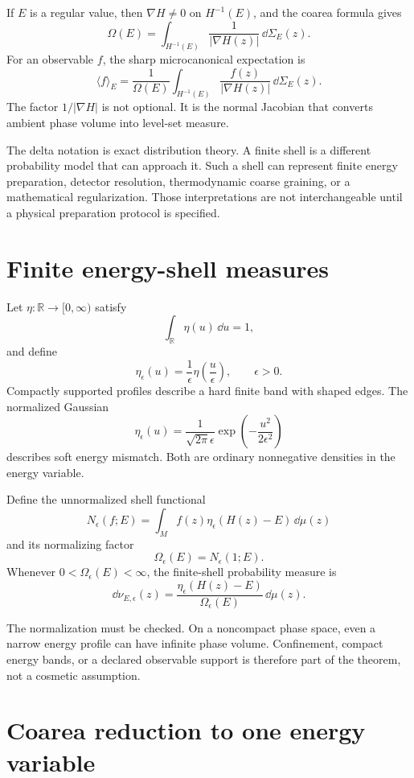 \documentclass[11pt]{article}
\begin{document}
If \(E\) is a regular value, then \(\nabla H\neq0\) on \(H^{-1}(E)\), and the
coarea formula gives
\[
\Omega(E)
=
\int_{H^{-1}(E)}
\frac{1}{|\nabla H(z)|}\,\dd\Sigma_E(z).
\]
For an observable \(f\), the sharp microcanonical expectation is
\[
\langle f\rangle_E
=
\frac{1}{\Omega(E)}
\int_{H^{-1}(E)}
\frac{f(z)}{|\nabla H(z)|}\,\dd\Sigma_E(z).
\]
The factor \(1/|\nabla H|\) is not optional. It is the normal Jacobian that
converts ambient phase volume into level-set measure.

The delta notation is exact distribution theory. A finite shell is a different
probability model that can approach it. Such a shell can represent finite
energy preparation, detector resolution, thermodynamic coarse graining, or a
mathematical regularization. Those interpretations are not interchangeable
until a physical preparation protocol is specified.

\section{Finite energy-shell measures}

Let \(\eta:\mathbb R\to[0,\infty)\) satisfy
\[
\int_{\mathbb R}\eta(u)\,\dd u=1,
\]
and define
\[
\eta_\epsilon(u)
=
\frac{1}{\epsilon}\eta\!\left(\frac{u}{\epsilon}\right),
\qquad \epsilon>0.
\]
Compactly supported profiles describe a hard finite band with shaped edges.
The normalized Gaussian
\[
\eta_\epsilon(u)
=
\frac{1}{\sqrt{2\pi}\epsilon}
\exp\!\left(-\frac{u^2}{2\epsilon^2}\right)
\]
describes soft energy mismatch. Both are ordinary nonnegative densities in the
energy variable.

Define the unnormalized shell functional
\[
N_\epsilon(f;E)
=
\int_M f(z)\eta_\epsilon(H(z)-E)\,\dd\mu(z)
\]
and its normalizing factor
\[
\Omega_\epsilon(E)
=
N_\epsilon(1;E).
\]
Whenever \(0<\Omega_\epsilon(E)<\infty\), the finite-shell probability measure
is
\[
\dd\nu_{E,\epsilon}(z)
=
\frac{\eta_\epsilon(H(z)-E)}
{\Omega_\epsilon(E)}\,\dd\mu(z).
\]

The normalization must be checked. On a noncompact phase space, even a narrow
energy profile can have infinite phase volume. Confinement, compact energy
bands, or a declared observable support is therefore part of the theorem, not
a cosmetic assumption.

\section{Coarea reduction to one energy variable}
\end{document}
